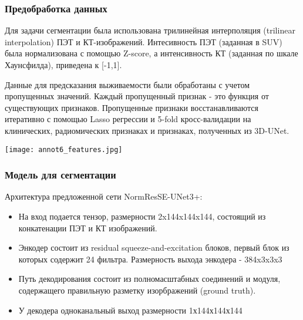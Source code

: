 \subsubsection*{Предобработка данных}
Для задачи сегментации была использована трилинейная интерполяция (trilinear interpolation) ПЭТ и КТ-изображений.
Интесивность ПЭТ (заданная в SUV) была нормализована с помощью Z-score, а интенсивность КТ (заданная по шкале Хаунсфилда), 
приведена к [-1,1]. \par
Данные для предсказания выживаемости были обработаны с учетом пропущенных значений. Каждый пропущенный признак - 
это функция от существующих признаков. Пропущенные признаки восстанавливаются итеративно
с помощью Lasso регрессии и 5-fold кросс-валидации на клинических, радиомических признаках и признаках, полученных из 3D-UNet.



\begin{minipage}{1.0\linewidth}
    \begin{center}
    
    \texttt{[image: annot6\_features.jpg]}
\end{center}
\end{minipage}


\subsubsection*{Модель для сегментации}
Архитектура предложенной сети NormResSE-UNet3+: 
\begin{itemize}
    \item На вход подается тензор, размерности 2x144x144x144, состоящий из конкатенации
    ПЭТ и КТ изображений.
    \item Энкодер состоит из residual squeeze-and-excitation блоков, первый блок из которых 
    содержит 24 фильтра. Размерность выхода энкодера - 384x3x3x3
    \item Путь декодирования состоит из полномасштабных соединений и модуля, содержащего 
    правильную разметку изорбражений (ground truth).
    \item У декодера одноканальный выход размерности 1х144х144х144
\end{itemize}



